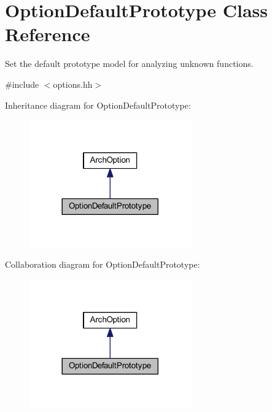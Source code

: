 \hypertarget{class_option_default_prototype}{}\section{Option\+Default\+Prototype Class Reference}
\label{class_option_default_prototype}


Set the default prototype model for analyzing unknown functions.  




{\ttfamily \#include $<$options.\+hh$>$}



Inheritance diagram for Option\+Default\+Prototype\+:
\nopagebreak
\begin{figure}[H]
\begin{center}
\leavevmode
\includegraphics[width=197pt]{class_option_default_prototype__inherit__graph}
\end{center}
\end{figure}


Collaboration diagram for Option\+Default\+Prototype\+:
\nopagebreak
\begin{figure}[H]
\begin{center}
\leavevmode
\includegraphics[width=197pt]{class_option_default_prototype__coll__graph}
\end{center}
\end{figure}
